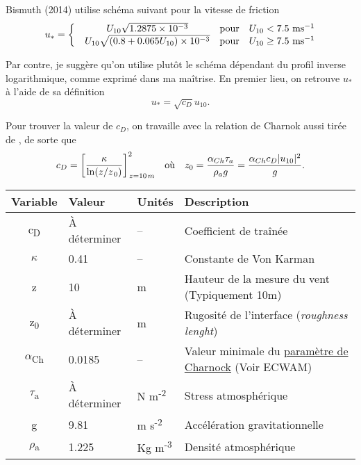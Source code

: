 \documentclass[10pt]{article}
\numberwithin{equation}{section}
\newcommand{\pt}{\hspace{1pt}} %
\begin{document}
Bismuth (2014) utilise schéma suivant pour la vitesse de friction
\begin{equation}
   u_* = \left\lbrace \begin{matrix}
     &U_{10}\sqrt{1.2875\times10^{-3}} & \text{pour}\quad U_{10} < 7.5\ \mathrm{ms}^{-1}\\
     &U_{10}\sqrt{\qty(0.8+0.065U_{10})\times10^{-3}} & \text{pour}\quad U_{10}\geq 7.5\ \mathrm{ms}^{-1}\\
   \end{matrix}\right.
\end{equation}




Par contre, je suggère qu'on utilise plutôt le schéma dépendant du profil inverse logarithmique, comme exprimé dans ma maîtrise.
En premier lieu, on retrouve \(u_*\) à l'aide de sa définition
\begin{equation}
   u_* = \sqrt{c_D} u_{10}.
\end{equation}


Pour trouver la valeur de \(c_D\), on travaille avec la relation de Charnok \autocite{charnock1955wind} aussi tirée de \Textcite[p.30]{gill-atmosphere-ocean}, de sorte que 
\begin{align}
\label{eq:orge7515bd}
   &&c_D = \qty[\frac{\kappa}{\ln(z/z_{\pt0})}]_{\pt z=10\pt m}^2
   && \text{où} &&
   z_0 = \frac{\alpha_{Ch}\tau_a}{\rho_a g} = \frac{\alpha_{Ch} c_D |u_{10}|^2}{g}. &&
\end{align}

\begin{center}
\begin{tabular}{clll}
Variable & Valeur & Unités & Description\\
\hline
c\textsubscript{D} & À déterminer & -- & Coefficient de traînée\\
\(\kappa\) & 0.41 & -- & Constante de Von Karman\\
z & 10 & m & Hauteur de la mesure du vent (Typiquement 10m)\\
z\textsubscript{0} & À déterminer & m & Rugosité de l'interface (\emph{roughness lenght})\\
\(\alpha\)\textsubscript{Ch} & 0.0185 & -- & Valeur minimale du \href{https://codes.ecmwf.int/grib/param-db/148}{paramètre de Charnock} (Voir ECWAM)\\
\(\tau\)\textsubscript{a} & À déterminer & N m\textsuperscript{-2} & Stress atmosphérique\\
g & 9.81 & m s\textsuperscript{-2} & Accélération gravitationnelle\\
\(\rho\)\textsubscript{a} & 1.225 & Kg m\textsuperscript{-3} & Densité atmosphérique\\
\end{tabular}
\end{center}
\end{document}
